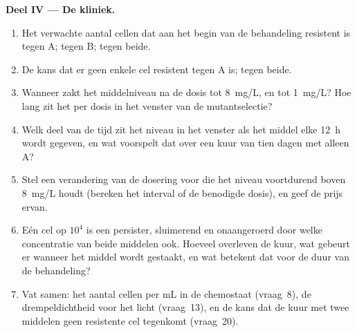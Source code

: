\begin{problem}
\medskip
\noindent\textbf{Deel IV --- De kliniek.}
\begin{enumerate}[resume]
  \item Het verwachte aantal cellen dat aan het begin van de behandeling
        resistent is tegen A; tegen B; tegen beide.
  \item De kans dat er geen enkele cel resistent tegen A is; tegen
        beide.
  \item Wanneer zakt het middelniveau na de dosis tot \qty{8}{mg/L}, en
        tot \qty{1}{mg/L}? Hoe lang zit het per dosis in het venster van
        de mutantselectie?
  \item Welk deel van de tijd zit het niveau in het venster als het
        middel elke \qty{12}{h} wordt gegeven, en wat voorspelt dat over
        een kuur van tien dagen met alleen A?
  \item Stel een verandering van de dosering voor die het niveau
        voortdurend boven \qty{8}{mg/L} houdt (bereken het interval of
        de benodigde dosis), en geef de prijs ervan.
  \item Eén cel op $10^{4}$ is een persister, sluimerend en onaangeroerd
        door welke concentratie van beide middelen ook. Hoeveel
        overleven de kuur, wat gebeurt er wanneer het middel wordt
        gestaakt, en wat betekent dat voor de duur van de behandeling?
  \item Vat samen: het aantal cellen per mL in de chemostaat (vraag~8),
        de drempeldichtheid voor het licht (vraag~13), en de kans dat de
        kuur met twee middelen geen resistente cel tegenkomt
        (vraag~20).
\end{enumerate}
\end{problem}
